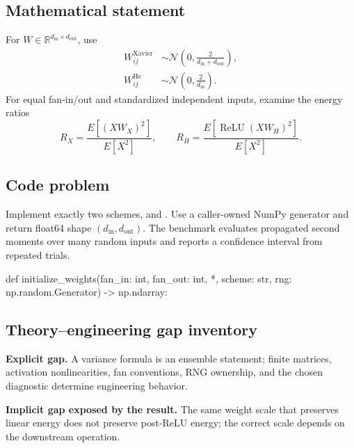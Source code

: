 
        \subsection{Mathematical statement}


For $W\in\mathbb R^{d_{\mathrm{in}}\times d_{\mathrm{out}}}$, use
\[
\begin{aligned}
W_{ij}^{\mathrm{Xavier}}&\sim\mathcal N\!\left(0,\frac{2}{d_{\mathrm{in}}+d_{\mathrm{out}}}\right),\\
W_{ij}^{\mathrm{He}}&\sim\mathcal N\!\left(0,\frac{2}{d_{\mathrm{in}}}\right).
\end{aligned}
\]
For equal fan-in/out and standardized independent inputs, examine the energy
ratios
\[
R_X=\frac{E[(XW_X)^2]}{E[X^2]},\qquad
R_H=\frac{E[\operatorname{ReLU}(XW_H)^2]}{E[X^2]}.
\]


        \subsection{Code problem}


Implement exactly two schemes,  and
.\newline
Use a caller-owned NumPy generator and return float64 shape
$(d_{\mathrm{in}},d_{\mathrm{out}})$.  The benchmark evaluates propagated second
moments over many random inputs and reports a confidence interval from repeated
trials.


        \begin{contractbox}
        \begin{Code}
        def initialize_weights(fan_in: int, fan_out: int, *, scheme: str, rng: np.random.Generator) -> np.ndarray:
        \end{Code}
        \end{contractbox}

        \subsection{Theory--engineering gap inventory}

        \begin{gapbox}
        \textbf{Explicit gap.} A variance formula is an ensemble statement; finite matrices, activation nonlinearities, fan conventions, RNG ownership, and the chosen diagnostic determine engineering behavior.

        \textbf{Implicit gap exposed by the result.} The same weight scale that preserves linear energy does not preserve post-ReLU energy; the correct scale depends on the downstream operation.
        \end{gapbox}

